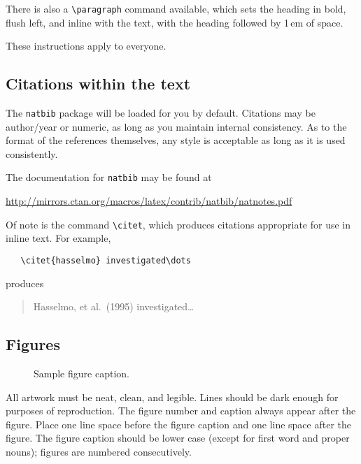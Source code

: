 \documentclass{article}
\begin{document}
There is also a \verb+\paragraph+ command available, which sets the heading in
bold, flush left, and inline with the text, with the heading followed by 1\,em
of space.

\label{others}


These instructions apply to everyone.


\subsection{Citations within the text}


The \verb+natbib+ package will be loaded for you by default.  Citations may be
author/year or numeric, as long as you maintain internal consistency.  As to the
format of the references themselves, any style is acceptable as long as it is
used consistently.


The documentation for \verb+natbib+ may be found at
\begin{center}
  \url{http://mirrors.ctan.org/macros/latex/contrib/natbib/natnotes.pdf}
\end{center}
Of note is the command \verb+\citet+, which produces citations appropriate for
use in inline text.  For example,
\begin{verbatim}
   \citet{hasselmo} investigated\dots
\end{verbatim}
produces
\begin{quote}
  Hasselmo, et al.\ (1995) investigated\dots
\end{quote}

\subsection{Figures}


\begin{figure}
  \centering
  \fbox{\rule[-.5cm]{0cm}{4cm} \rule[-.5cm]{4cm}{0cm}}
  \caption{Sample figure caption.}
\end{figure}


All artwork must be neat, clean, and legible. Lines should be dark enough for
purposes of reproduction. The figure number and caption always appear after the
figure. Place one line space before the figure caption and one line space after
the figure. The figure caption should be lower case (except for first word and
proper nouns); figures are numbered consecutively.
\end{document}
